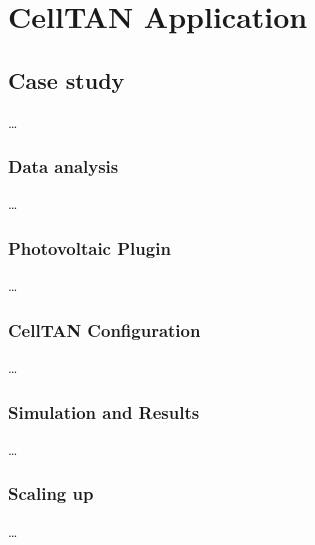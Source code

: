 \chapter{CellTAN Application} \label{chap:chap5}


\section{Case study}

\dots

\subsection{Data analysis}

\dots

\subsection{Photovoltaic Plugin}

\dots

\subsection{CellTAN Configuration}

\dots

\subsection{Simulation and Results}

\dots

\subsection{Scaling up}

\dots


